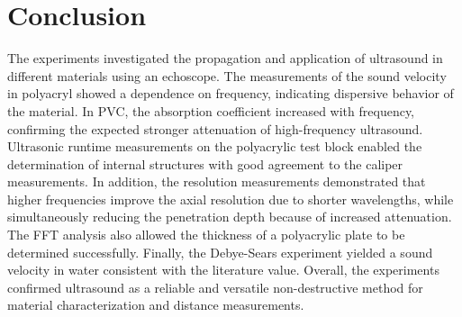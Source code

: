 \section{Conclusion}

The experiments investigated the propagation and application of ultrasound in different materials using 
an echoscope. The measurements of the sound velocity in polyacryl showed a dependence on frequency, 
indicating dispersive behavior of the material. In PVC, the absorption coefficient increased with 
frequency, confirming the expected stronger attenuation of high-frequency ultrasound.
Ultrasonic runtime measurements on the polyacrylic test block enabled the determination of internal 
structures with good agreement to the caliper measurements. In addition, the resolution measurements 
demonstrated that higher frequencies improve the axial resolution due to shorter wavelengths, while 
simultaneously reducing the penetration depth because of increased attenuation. The FFT analysis also 
allowed the thickness of a polyacrylic plate to be determined successfully.
Finally, the Debye-Sears experiment yielded a sound velocity in water consistent with the literature value. 
Overall, the experiments confirmed ultrasound as a reliable and versatile non-destructive method for 
material characterization and distance measurements.